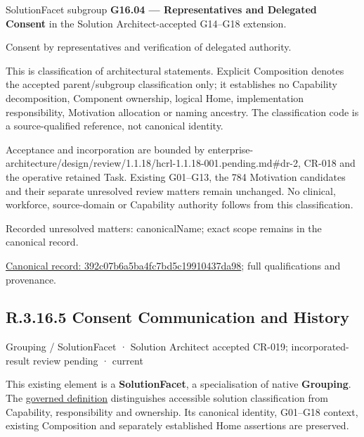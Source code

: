 SolutionFacet subgroup \textbf{G16.04 — Representatives and Delegated Consent} in the Solution Architect-accepted G14–G18 extension.



Consent by representatives and verification of delegated authority.



This is classification of architectural statements. Explicit Composition denotes the accepted parent/subgroup classification only; it establishes no Capability decomposition, Component ownership, logical Home, implementation responsibility, Motivation allocation or naming ancestry. The classification code is a source-qualified reference, not canonical identity.



Acceptance and incorporation are bounded by enterprise-architecture/design/review/1.1.18/hcrl-1.1.18-001.pending.md\#dr-2, CR-018 and the operative retained Task. Existing G01–G13, the 784 Motivation candidates and their separate unresolved review matters remain unchanged. No clinical, workforce, source-domain or Capability authority follows from this classification.


{\small Recorded unresolved matters: canonicalName; exact scope remains in the canonical record.}\par
{\footnotesize \href{../../../../../../../continuum/grouping/392c07b6a5ba4fc7bd5c19910437da98.md}{Canonical record: 392c07b6a5ba4fc7bd5c19910437da98}; full qualifications and provenance.}\par
\subsection*{R.3.16.5 Consent Communication and History}
\label{navigation:R.3.16.5}

\label{element:52508b8b7aec4b1cbaa570576442d4c9}
{\small Grouping / SolutionFacet · Solution Architect accepted CR-019; incorporated-result review pending · current}\par

This existing element is a \textbf{SolutionFacet}, a specialisation of native
\textbf{Grouping}. The \href{\detokenize{../../../../../../../governance/continuum-representation.md#solutionfacet-classification--1119-candidate}}{governed definition}
distinguishes accessible solution classification from Capability, responsibility
and ownership. Its canonical identity, G01–G18 context, existing Composition
and separately established Home assertions are preserved.



